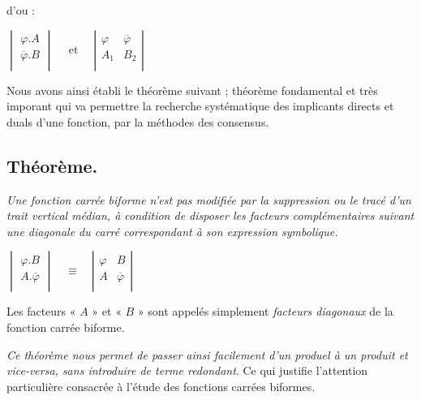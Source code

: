 \begin{itemize}
d'ou : 
\bigskip 


\centerline{
 $  \begin{vmatrix}  {\varphi} . A  \\
                                 \overline{ \varphi} . B  \\
                               \end{vmatrix}
                                \quad \text{ et } \quad  
                                \left| \begin{array}{c|c} \varphi  & \overline{\varphi}\\ A_1 & B_2 \\
\end{array} \right| $
}

\medskip 

Nous avons ainsi établi le théorème suivant ; théorème fondamental et très imporant qui va permettre la recherche systématique des implicants directs et duals d'une fonction, par la méthodes des consensus.

\subsection{Théorème.}  \textsl{Une fonction carrée biforme n'est pas modifiée par la suppression ou le tracé d'un trait vertical médian, à condition de disposer les facteurs complémentaires suivant une diagonale du carré correspondant à son expression symbolique.}

\bigskip 

\centerline{
 $  \begin{vmatrix}  {\varphi} . B  \\
                                 A . \overline{ \varphi}   \\
       \end{vmatrix}
                     \quad \equiv \quad 
                                \left| \begin{array}{c|c} 
                                     \varphi  & B \\
                                      A & \overline{\varphi} \\
                                \end{array} \right| $
}

\medskip 

Les facteurs « $A$ » et « $B$ » sont appelés simplement \textsl{facteurs diagonaux} de la fonction carrée biforme. 

\textsl{Ce théorème nous permet de passer ainsi facilement d'un produel à un produit et vice-versa, sans introduire de terme redondant}. Ce qui justifie l'attention particulière consacrée à l'étude des fonctions carrées biformes. 

\end{itemize}


